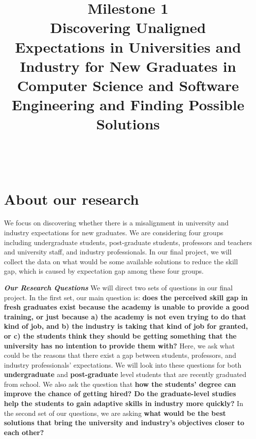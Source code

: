 \documentclass{sigchi}
\begin{document}
\title{Milestone 1\\ Discovering Unaligned Expectations in Universities and Industry for New Graduates in Computer Science and Software Engineering and Finding Possible Solutions}

\author{%
  \\
  \\
}

\maketitle

\section{About our research}

We focus on discovering whether there is a misalignment in university and industry expectations for new graduates. We are considering four groups including undergraduate students, post-graduate students, professors and teachers and university staff, and industry professionals. In our final project, we will collect the data on what would be some available solutions to reduce the skill gap, which is caused by expectation gap among these four groups.

\textit{\textbf{Our Research Questions}}\newline
We will direct two sets of questions in our final project. In the first set, our main question is: \textbf{does the perceived skill gap in fresh graduates exist because the academy is unable to provide a good training, or just because a) the academy is not even trying to do that kind of job, and b) the industry is taking that kind of job for granted, or c) the students think they should be getting something that the university has no intention to provide them with?} Here, we ask what could be the reasons that there exist a gap between students, professors, and industry professionals' expectations. We will look into these questions for both \textbf{undergraduate} and \textbf{post-graduate} level students that are recently graduated from school. We also ask the question that \textbf{how the students' degree can improve the chance of getting hired? Do the graduate-level studies help the students to gain adaptive skills in industry more quickly?}\newline
In the second set of our questions, we are asking \textbf{what would be the best solutions that bring the university and industry's objectives closer to each other?} 
\end{document}
